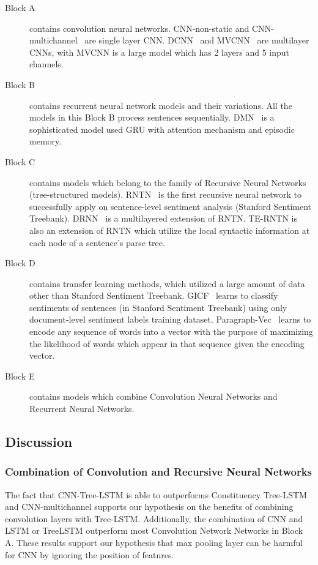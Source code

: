 \begin{description}
	\item[Block A] contains convolution neural networks.
	CNN-non-static and CNN-multichannel~\cite{KimCNN} are single layer CNN.
	DCNN~\cite{DCNN} and MVCNN~\cite{2-layer-cnn} are multilayer CNNs, with MVCNN is a large model  which has 2 layers and 5 input channels.
	\item[Block B] contains recurrent neural network models and their variations.
	All the models in this Block B process sentences sequentially.
	DMN~\cite{attention-gru} is a sophisticated model used GRU with attention mechanism and episodic memory.
	\item[Block C] contains models which belong to the family of Recursive Neural Networks (tree-structured models).
	RNTN~\cite{socher2013recursive} is the first recursive neural network to successfully apply on sentence-level sentiment analysis (Stanford Sentiment Treebank).
	DRNN~\cite{IrsoyDRNN} is a multilayered extension of RNTN.
	TE-RNTN is also an extension of RNTN which utilize the local syntactic information at each node of a sentence's parse tree.
	\item[Block D] contains transfer learning methods, which utilized a large amount of data other than Stanford Sentiment Treebank.
	GICF~\cite{group-instance} learns to classify sentiments of sentences (in Stanford Sentiment Treebank) using only document-level sentiment labels training dataset.
	Paragraph-Vec~\cite{ParagraphVec} learns to encode any sequence of words into a vector with the purpose of maximizing the likelihood of words which appear in that sequence given the encoding vector.
	\item[Block E] contains models which combine Convolution Neural Networks and Recurrent Neural Networks.
\end{description}
\subsection{Discussion}
\subsubsection{Combination of Convolution and Recursive Neural Networks}
The fact that CNN-Tree-LSTM is able to outperforms Constituency Tree-LSTM~\cite{treeLSTM} and CNN-multichannel\cite{KimCNN} supports our hypothesis on the benefits of combining convolution layers with Tree-LSTM.
Additionally, the combination of CNN and LSTM or TreeLSTM outperform most Convolution Network Networks in Block A.
These results support our hypothesis that max pooling layer can be harmful for CNN by ignoring the position of features.
